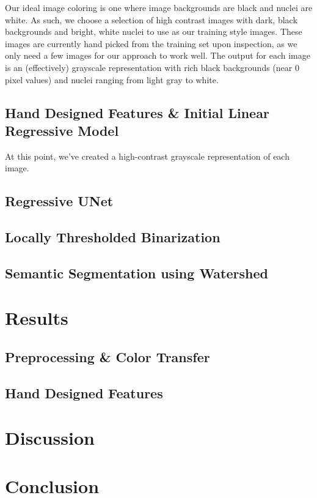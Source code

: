 \documentclass[paper=letter, fontsize=12pt]{article}
\numberwithin{equation}{section} %
\numberwithin{figure}{section} %
\numberwithin{table}{section} %
\begin{document}
Our ideal image coloring is one where image backgrounds are black and nuclei
are white.  As such, we choose a selection of high contrast images with dark,
black backgrounds and bright, white nuclei to use as our training style images.
These images are currently hand picked from the training set upon inspection,
as we only need a few images for our approach to work well.  The output for
each image is an (effectively) grayscale representation with rich black
backgrounds (near 0 pixel values) and nuclei ranging from light gray to white.

\subsection{Hand Designed Features \& Initial Linear Regressive Model}

At this point, we've created a high-contrast grayscale representation of each
image.

\subsection{Regressive UNet}

\subsection{Locally Thresholded Binarization}

\subsection{Semantic Segmentation using Watershed}

\section{Results}

\subsection{Preprocessing \& Color Transfer}

\subsection{Hand Designed Features}

\section{Discussion}

\section{Conclusion}
\end{document}
